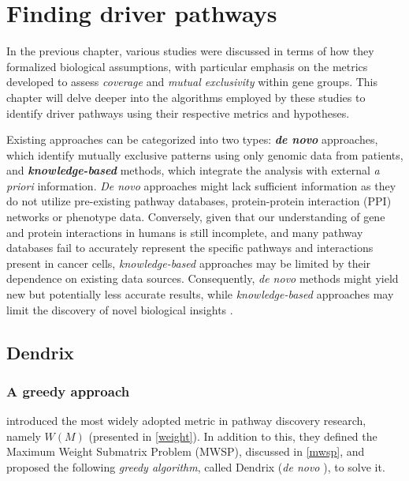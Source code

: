 \chapter{Finding driver pathways} \label{chap:finding_driver_pathways}

In the previous chapter, various studies were discussed in terms of how they formalized biological assumptions, with particular emphasis on the metrics developed to assess \textit{coverage} and \textit{mutual exclusivity} within gene groups. This chapter will delve deeper into the algorithms employed by these studies to identify driver pathways using their respective metrics and hypotheses.

Existing approaches can be categorized into two types: \textbf{\textit{de novo}} approaches, which identify mutually exclusive patterns using only genomic data from patients, and \textbf{\textit{knowledge-based}} methods, which integrate the analysis with external \textit{a priori} information. \textit{De novo} approaches might lack sufficient information as they do not utilize pre-existing pathway databases, protein-protein interaction (PPI) networks or phenotype data. Conversely, given that our understanding of gene and protein interactions in humans is still incomplete, and many pathway databases fail to accurately represent the specific pathways and interactions present in cancer cells, \textit{knowledge-based} approaches may be limited by their dependence on existing data sources. Consequently, \textit{de novo} methods might yield new but potentially less accurate results, while \textit{knowledge-based} approaches may limit the discovery of novel biological insights \cite{survey, multi-dendrix}.

\section{Dendrix}

\subsection{A greedy approach} \label{dendrix_first_sub}

\textcite{dendrix} introduced the most widely adopted metric in pathway discovery research, namely $W(M)$ (presented in \cref{weight}). In addition to this, they defined the Maximum Weight Submatrix Problem (MWSP), discussed in \cref{mwsp}, and proposed the following \textit{greedy algorithm}, called Dendrix (\textit{de novo} \cite{survey}), to solve it.

